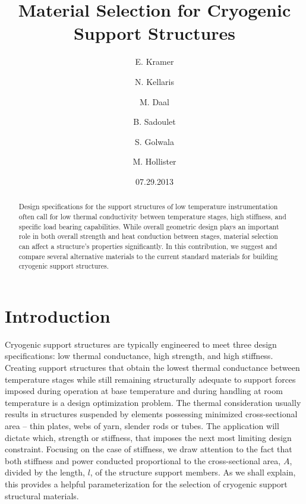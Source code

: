 \documentclass[final]{svjour2}
\begin{document}
\newcommand{\hdblarrow}{H\makebox[0.9ex][l]{$\downdownarrows$}-}
\title{Material Selection for Cryogenic Support Structures}

\author{E. Kramer \and N. Kellaris  \and M. Daal  \and B. Sadoulet \and S. Golwala \and M. Hollister}


\date{07.29.2013}

\maketitle

\begin{abstract}

Design specifications for the support structures of low temperature instrumentation often call for low thermal conductivity between temperature stages, high stiffness, and specific load bearing capabilities.  While overall geometric design plays an important role in both overall strength and heat conduction between stages, material selection can affect a structure's properties significantly.  In this contribution, we suggest and compare several alternative materials to the current standard materials for building cryogenic support structures.


\end{abstract}

\section{Introduction}
Cryogenic support structures are typically engineered to meet three design specifications: low thermal conductance, high strength, and high stiffness. Creating support structures that obtain the lowest thermal conductance between temperature stages while still remaining structurally adequate to support forces imposed during operation at base temperature and during handling at room temperature is a design optimization problem. The thermal consideration usually results in structures suspended by elements possessing minimized cross-sectional area -- thin plates, webs of yarn, slender rods or tubes. The application will dictate which, strength or stiffness, that imposes the next most limiting design constraint. Focusing on the case of stiffness, we draw attention to the fact that both stiffness and power conducted proportional to the cross-sectional area, $A$, divided by the length, $l$, of the structure support members.\cite{Hastings1993} As we shall explain, this provides a helpful parameterization for the selection of cryogenic support structural materials.
\end{document}
